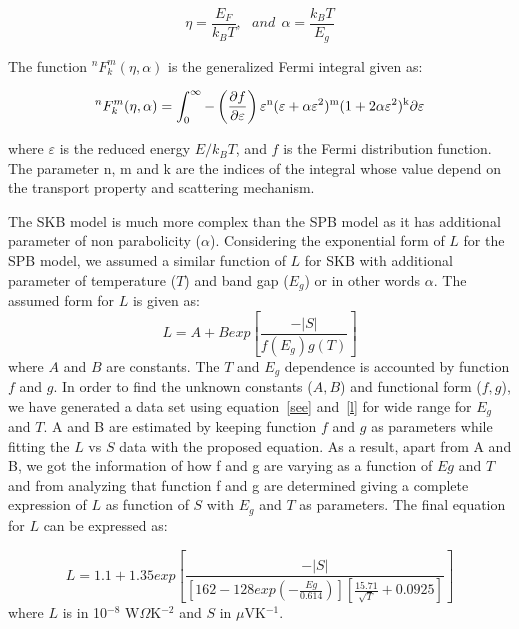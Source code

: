 \documentclass[%
 aip,
 amsmath,amssymb,
reprint, onecolumn %
]{revtex4-1}
\begin{document}
\begin{equation}
    \eta = \frac{E_{F} }{k_{B}T}, ~~~and ~~ \alpha = \frac{k_{B}T}{E_{g}}
\end{equation} 

The function $^nF^m_{k}(\eta,\alpha)$ is the generalized Fermi integral given as:

\begin{equation}
    ^nF^m_{k}(\eta,\alpha) = \int_{0}^{\infty}{-\left(\frac{\partial f}{\partial \varepsilon}\right) \varepsilon\textsuperscript{n}(\varepsilon +\alpha \varepsilon\textsuperscript{2})\textsuperscript{m}(1 + 2\alpha\varepsilon\textsuperscript{2})\textsuperscript{k}\partial \varepsilon}
\end{equation} 

where $\varepsilon$ is the reduced energy $E/k_BT$, and $f$ is the Fermi distribution function. The parameter n, m and k are the indices of the integral whose value depend on the transport property and scattering mechanism.

The SKB model is much more complex than the SPB model as it has additional parameter of non parabolicity ($\alpha$). Considering the exponential form of $L$ for the SPB model, we assumed a similar function of $L$ for SKB with additional parameter of temperature ($T$) and band gap ($E_g$) or in other words $\alpha$. The assumed form for $L$ is given as:
\begin{equation} \label{new}
    L  = A + Bexp \left[\frac{-|S|}{f(E_g)g(T)} \right]
\end{equation}
where $A$ and $B$ are constants. The $T$ and $E_g$ dependence is accounted by function $f$ and $g$. 
In order to find the unknown constants ($A, B$) and functional form ($f, g$), we have generated a data set using equation~\ref{see} and~\ref{l} for wide range for $E_g$ and $T$. A and B are estimated by keeping function $f$ and $g$ as parameters while fitting the $L$ vs $S$ data with the proposed equation. As a result, apart from A and B,  we got the information of how f and g are varying as a function of $Eg$ and $T$ and from analyzing that function f and g are determined giving a complete expression of $L$ as function of $S$ with $E_g$ and $T$ as parameters. The final equation for $L$ can be expressed as:

\begin{equation} \label{new}
    L  = 1.1 + 1.35 exp \left[\frac{-|S|}{\left[162 - 128exp \left(-\frac{Eg}{0.614}\right)     \right]  \left[\frac{15.71}{\sqrt{T}} + 0.0925   \right]}       \right]
\end{equation} 
where $L$ is in 10$^{-8}$ W$\Omega$K$^{-2}$ and $S$ in $\mu$VK$^{-1}$. \\
\end{document}
